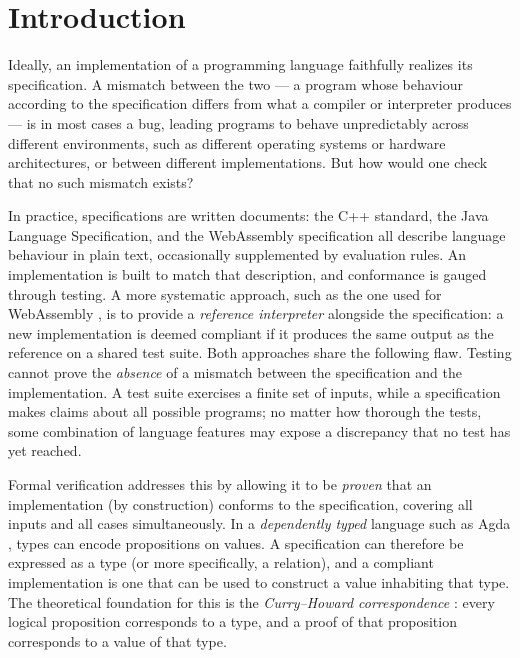 

\chapter{Introduction} %

Ideally, an implementation of a programming language faithfully realizes its specification.
A mismatch between the two --- a program whose behaviour according to the specification differs from what a compiler or interpreter produces --- is in most cases a bug, leading programs to behave unpredictably across different environments, such as different operating systems or hardware architectures, or between different implementations.
But how would one check that no such mismatch exists?

In practice, specifications are written documents: the C++ standard, the Java Language Specification, and the WebAssembly specification all describe language behaviour in plain text, occasionally supplemented by evaluation rules.
An implementation is built to match that description, and conformance is gauged through testing.
A more systematic approach, such as the one used for WebAssembly \cite{wasm-spec}, is to provide a \textit{reference interpreter} alongside the specification: a new implementation is deemed compliant if it produces the same output as the reference on a shared test suite.
Both approaches share the following flaw. Testing cannot prove the \textit{absence} of a mismatch between the specification and the implementation.
A test suite exercises a finite set of inputs, while a specification makes claims about all possible programs; no matter how thorough the tests, some combination of language features may expose a discrepancy that no test has yet reached.

Formal verification addresses this by allowing it to be \textit{proven} that an implementation (by construction) conforms to the specification, covering all inputs and all cases simultaneously.
In a \textit{dependently typed} language such as Agda \cite{vfpinagda}, types can encode propositions on values.
A specification can therefore be expressed as a type (or more specifically, a relation), and a compliant implementation is one that can be used to construct a value inhabiting that type.
The theoretical foundation for this is the \textit{Curry--Howard correspondence} \cite{propositionsastypes}: every logical proposition corresponds to a type, and a proof of that proposition corresponds to a value of that type.

